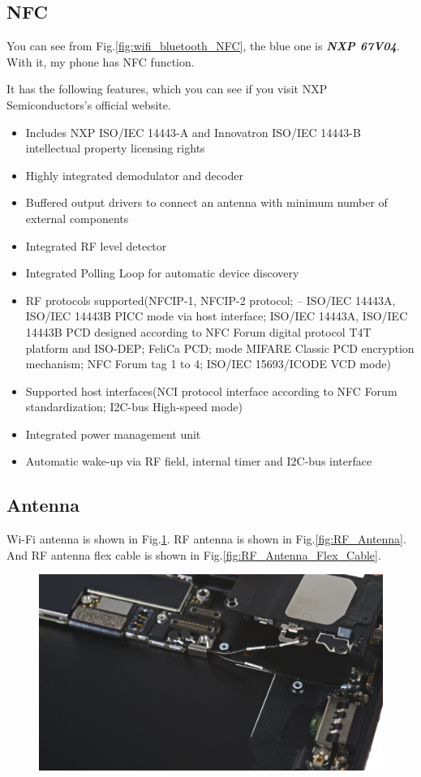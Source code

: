 \documentclass[conference]{IEEEtran}
\begin{document}
\subsection{NFC}
You can see from Fig.\ref{fig:wifi_bluetooth_NFC}, the blue one is {\bfseries{\emph{NXP 67V04}}}. With it, my phone has NFC function. 

It has the following features\cite{NXP.org}, which you can see if you visit NXP Semiconductors's official website\cite{nxp_honepage.org}.
\begin{itemize}
	\item Includes NXP ISO/IEC 14443-A and Innovatron ISO/IEC 14443-B intellectual property licensing rights
	\item Highly integrated demodulator and decoder
	\item Buffered output drivers to connect an antenna with minimum number of external components
	\item Integrated RF level detector
	\item Integrated Polling Loop for automatic device discovery
	\item RF protocols supported(NFCIP-1, NFCIP-2 protocol; – ISO/IEC 14443A, ISO/IEC 14443B PICC mode via host interface; ISO/IEC 14443A, ISO/IEC 14443B PCD designed according to NFC Forum digital protocol T4T platform and ISO-DEP; FeliCa PCD; mode MIFARE Classic PCD encryption mechanism; NFC Forum tag 1 to 4; ISO/IEC 15693/ICODE VCD mode)
	\item Supported host interfaces(NCI protocol interface according to NFC Forum standardization; I2C-bus High-speed mode)
	\item Integrated power management unit
	\item Automatic wake-up via RF field, internal timer and I2C-bus interface	
\end{itemize}

\subsection{Antenna}
Wi-Fi antenna is shown in Fig.\ref{fig:Wi-Fi_Antenna}. RF antenna is shown in Fig.\ref{fig:RF_Antenna}. And RF antenna flex cable is shown in Fig.\ref{fig:RF_Antenna_Flex_Cable}.
\begin{figure}[!ht]
	\centering
	\begin{center}
		\includegraphics*[width=0.8\linewidth]{antenna1}
		\caption{}
		\label{fig:Wi-Fi_Antenna}
	\end{center}
\end{figure}
\end{document}

